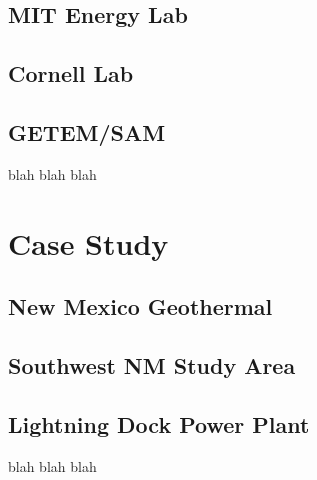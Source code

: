 \subsection{MIT Energy Lab}
\subsection{Cornell Lab}
\subsection{GETEM/SAM}
blah blah blah

\section{Case Study}\label{ch2:case}
\subsection{New Mexico Geothermal}
\subsection{Southwest NM Study Area}
\subsection{Lightning Dock Power Plant}
blah blah blah




%


